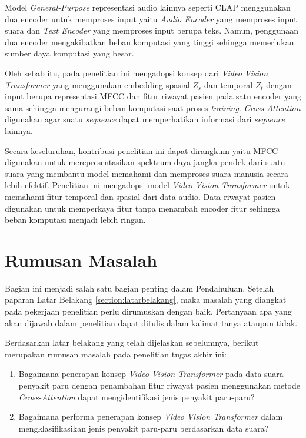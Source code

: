 Model \textit{General-Purpose} representasi audio lainnya seperti CLAP \cite{elizalde2024naturallanguagesupervisiongeneralpurpose} menggunakan dua encoder untuk memproses input yaitu \textit{Audio Encoder} yang memproses input suara dan \textit{Text Encoder} yang memproses input berupa teks. Namun, penggunaan dua encoder mengakibatkan beban komputasi yang tinggi sehingga memerlukan sumber daya komputasi yang besar.

Oleh sebab itu, pada penelitian ini mengadopsi konsep dari \textit{Video Vision Transformer} \cite{arnab2021vivitvideovisiontransformer} yang menggunakan embedding spasial $Z_s$ dan temporal $Z_t$ dengan input berupa representasi MFCC dan fitur riwayat pasien pada satu encoder yang sama sehingga mengurangi beban komputasi saat proses \textit{training}. \textit{Cross-Attention} \cite{9859720} digunakan agar suatu \textit{sequence} dapat memperhatikan informasi dari \textit{sequence} lainnya.

Secara keseluruhan, kontribusi penelitian ini dapat dirangkum yaitu MFCC digunakan untuk merepresentasikan spektrum daya jangka pendek dari suatu suara yang membantu model memahami dan memproses suara manusia secara lebih efektif. Penelitian ini mengadopsi model \textit{Video Vision Transformer} untuk memahami fitur temporal dan spasial dari data audio. Data riwayat pasien digunakan untuk memperkaya fitur tanpa menambah encoder fitur sehingga beban komputasi menjadi lebih ringan.

\section{Rumusan Masalah}
Bagian ini menjadi salah satu bagian penting dalam Pendahuluan. Setelah paparan Latar Belakang \ref{section:latarbelakang}, maka masalah yang diangkat pada pekerjaan penelitian perlu dirumuskan dengan baik. Pertanyaan apa yang akan dijawab dalam penelitian dapat ditulis dalam kalimat tanya ataupun tidak.

Berdasarkan latar belakang yang telah dijelaskan sebelumnya, berikut merupakan rumusan masalah pada penelitian tugas akhir ini:
\begin{enumerate}
	\item
        Bagaimana penerapan konsep \textit{Video Vision Transformer} pada data suara penyakit paru dengan penambahan fitur riwayat pasien menggunakan metode \textit{Cross-Attention} dapat mengidentifikasi jenis penyakit paru-paru?
        \item
        Bagaimana performa penerapan konsep \textit{Video Vision Transformer} dalam mengklasifikasikan jenis penyakit paru-paru berdasarkan data suara?
\end{enumerate}


